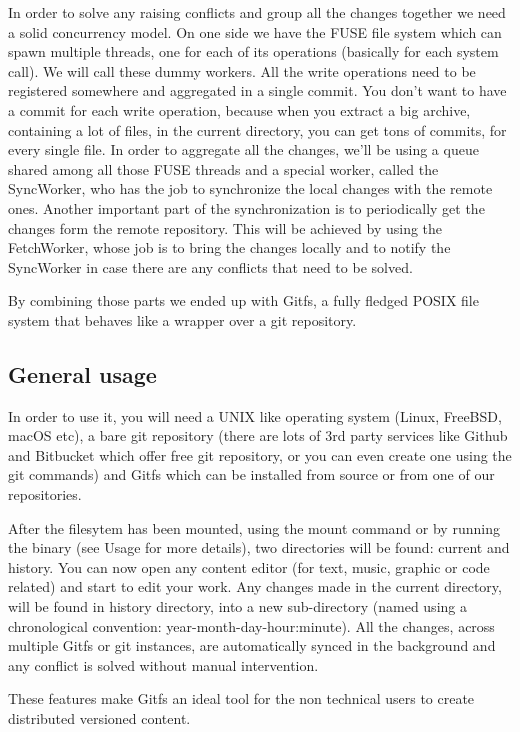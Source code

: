 In order to solve any raising conflicts and group all the changes together we need a solid concurrency model. On one side we have the FUSE file system which can spawn multiple threads, one for each of its operations (basically for each system call). We will call these dummy workers. All the write operations need to be registered somewhere and aggregated in a single commit. You don't want to have a commit for each write operation, because when you extract a big archive, containing a lot of files, in the current directory, you can get tons of commits, for every single file. In order to aggregate all the changes, we'll be using a queue shared among all those FUSE threads and a special worker, called the SyncWorker, who has the job to synchronize the local changes with the remote ones. Another important part of the synchronization is to periodically get the changes form the remote repository. This will be achieved by using the FetchWorker, whose job is to bring the changes locally and to notify the SyncWorker in case there are any conflicts that need to be solved.

By combining those parts we ended up with Gitfs, a fully fledged POSIX file system that behaves like a wrapper over a git repository.

\subsection{General usage}
In order to use it, you will need a UNIX like operating system (Linux, FreeBSD, macOS etc), a bare git repository (there are lots of 3rd party services like Github and Bitbucket which offer free git repository, or you can even create one using the git commands) and Gitfs which can be installed from source or from one of our repositories.

After the filesytem has been mounted, using the mount command or by running the binary (see Usage for more details), two directories will be found: current and history. You can now open any content editor (for text, music, graphic or code related) and start to edit your work. Any changes made in the current directory, will be found in history directory, into a new sub-directory (named using a chronological convention: year-month-day-hour:minute). All the changes, across multiple Gitfs or git instances, are automatically synced in the background and any conflict is solved without manual intervention.

These features make Gitfs an ideal tool for the non technical users to create distributed versioned content.

